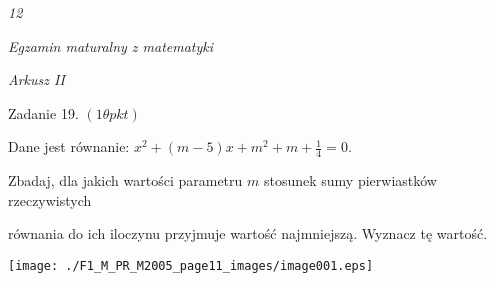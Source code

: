 \documentclass[a4paper,12pt]{article}
\begin{document}
{\it 12}

{\it Egzamin maturalny z matematyki}

{\it Arkusz II}

Zadanie 19. $(1\theta pkt)$

Dane jest równanie: $x^{2}+(m-5)x+m^{2}+m+\displaystyle \frac{1}{4}=0.$

Zbadaj, dla jakich wartości parametru $m$ stosunek sumy pierwiastków rzeczywistych

równania do ich iloczynu przyjmuje wartość najmniejszą. Wyznacz tę wartość.
\begin{center}
\texttt{[image: ./F1\_M\_PR\_M2005\_page11\_images/image001.eps]}
\end{center}
\end{document}
